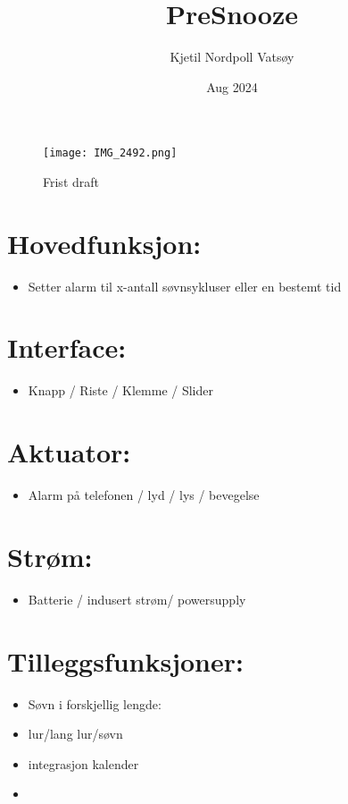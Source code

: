 \documentclass[12pt, a4paper]{article}
\begin{document}
\title{PreSnooze} 
\author{Kjetil Nordpoll Vatsøy}
\date{Aug 2024}

\maketitle
\begin{figure}[h]
\centering
\texttt{[image: IMG\_2492.png]}
\caption{Frist draft}
\end{figure}



\section {Hovedfunksjon:}
\begin{itemize}
    \item Setter alarm til x-antall søvnsykluser eller en bestemt tid
\end{itemize}


\section {Interface: }
\begin{itemize}
    \item Knapp / Riste / Klemme / Slider
\end{itemize}


\section {Aktuator:}
\begin{itemize}
    \item Alarm på telefonen / lyd / lys / bevegelse
\end{itemize}


\section {Strøm: }
\begin{itemize}
    \item Batterie / indusert strøm/ powersupply
\end{itemize}



\section {Tilleggsfunksjoner: }
\begin{itemize}
    \item Søvn i forskjellig lengde: 
    \item lur/lang lur/søvn
    \item integrasjon kalender
    \item 
\end{itemize}
\end{document}
